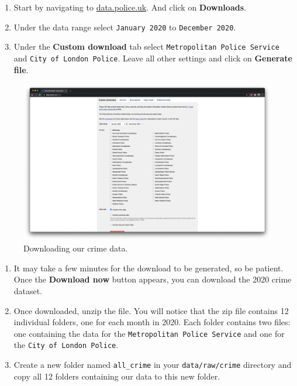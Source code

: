 \documentclass[
]{book}
\providecommand{\tightlist}{%
  \setlength{\itemsep}{0pt}\setlength{\parskip}{0pt}}
\begin{document}
\begin{enumerate}
\def\labelenumi{\arabic{enumi}.}
\tightlist
\item
  Start by navigating to \href{https://data.police.uk/}{data.police.uk}. And click on \textbf{Downloads}.
\item
  Under the data range select \texttt{January\ 2020} to \texttt{December\ 2020}.
\item
  Under the \textbf{Custom download} tab select \texttt{Metropolitan\ Police\ Service} and \texttt{City\ of\ London\ Police}. Leave all other settings and click on \textbf{Generate file}.
\end{enumerate}

\begin{figure}

{\centering \includegraphics[width=0.9\linewidth]{images/w04/download-crime} 

}

\caption{Downloading our crime data.}\label{fig:04-download-crimes}
\end{figure}

\begin{enumerate}
\def\labelenumi{\arabic{enumi}.}
\setcounter{enumi}{3}
\tightlist
\item
  It may take a few minutes for the download to be generated, so be patient. Once the \textbf{Download now} button appears, you can download the 2020 crime dataset.
\item
  Once downloaded, unzip the file. You will notice that the zip file contains 12 individual folders, one for each month in 2020. Each folder contains two files: one containing the data for the \texttt{Metropolitan\ Police\ Service} and one for the \texttt{City\ of\ London\ Police}.
\item
  Create a new folder named \texttt{all\_crime} in your \texttt{data/raw/crime} directory and copy all 12 folders containing our data to this new folder.
\end{enumerate}
\end{document}
